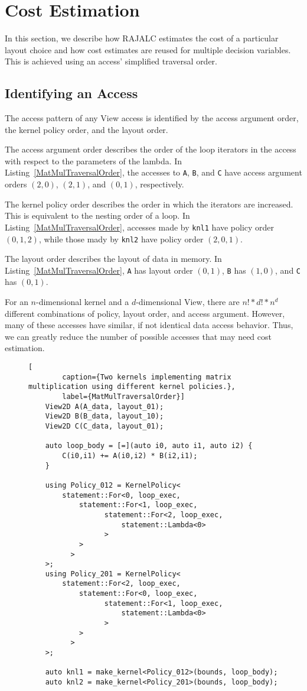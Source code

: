 \documentclass[sigconf, table]{acmart}
\begin{document}
\section{Cost Estimation}

In this section, we describe how RAJALC estimates the cost of a particular layout choice and how cost estimates are reused for multiple decision variables.
This is achieved using an access' simplified traversal order.

\subsection{Identifying an Access}
The access pattern of any View access is identified by the access argument order, the kernel policy order, and the layout order. 

The access argument order describes the order of the loop iterators in the access with respect to the parameters of the lambda. In Listing~\ref{MatMulTraversalOrder}, the accesses to \verb.A., \verb.B., and \verb.C. have access argument orders $(2,0)$, $(2,1)$, and $(0,1)$, respectively. 

The kernel policy order describes the order in which the iterators are increased. 
This is equivalent to the nesting order of a loop.
In Listing~\ref{MatMulTraversalOrder}, accesses made by \verb.knl1. have policy order $(0,1,2)$, while those mady by \verb.knl2. have policy order $(2,0,1)$.

The layout order describes the layout of data in memory. 
In Listing~\ref{MatMulTraversalOrder}, \verb.A. has layout order $(0,1)$, \verb.B. has $(1,0)$, and \verb.C. has $(0,1)$.

For an $n$-dimensional kernel and a $d$-dimensional View, there are $n! * d! * n^d$ different combinations of policy, layout order, and access argument. 
However, many of these accesses have similar, if not identical data access behavior. 
Thus, we can greatly reduce the number of possible accesses that may need cost estimation. 

\begin{figure}
	\begin{lstlisting}[
		caption={Two kernels implementing matrix multiplication using different kernel policies.},
		label={MatMulTraversalOrder}]
	View2D A(A_data, layout_01);
	View2D B(B_data, layout_10);
	View2D C(C_data, layout_01);
	
	auto loop_body = [=](auto i0, auto i1, auto i2) {
		C(i0,i1) += A(i0,i2) * B(i2,i1);
	}
	
	using Policy_012 = KernelPolicy<
		statement::For<0, loop_exec,
			statement::For<1, loop_exec,
				  statement::For<2, loop_exec,
					  statement::Lambda<0>
				  >
			>
		  >
	>;
	using Policy_201 = KernelPolicy<
		statement::For<2, loop_exec,
			statement::For<0, loop_exec,
				  statement::For<1, loop_exec,
					  statement::Lambda<0>
				  >
			>
		  >
	>;
	
	auto knl1 = make_kernel<Policy_012>(bounds, loop_body);
	auto knl2 = make_kernel<Policy_201>(bounds, loop_body);
	\end{lstlisting}
\end{figure}
\end{document}
